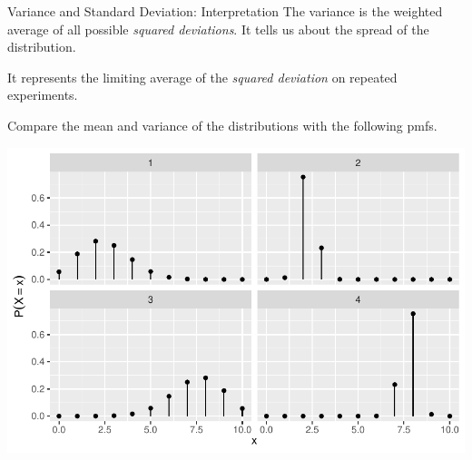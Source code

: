 \begin{frame}
  \begin{block}{Variance and Standard Deviation: Interpretation}
    The variance is the weighted average of all possible \textit{squared deviations}. It tells us about the spread of the distribution.
    
    \medskip
    It represents the limiting average of the \textit{squared deviation} on repeated experiments. 

  \end{block}
\end{frame}



\begin{frame}
  \begin{block}{\example}
  Compare the mean and variance of the distributions with the following pmfs.
  
  \begin{center}
    \includegraphics[height = .6\textheight]{figure/example-12-1-1-1}
  \end{center}
  \end{block}

\end{frame}

